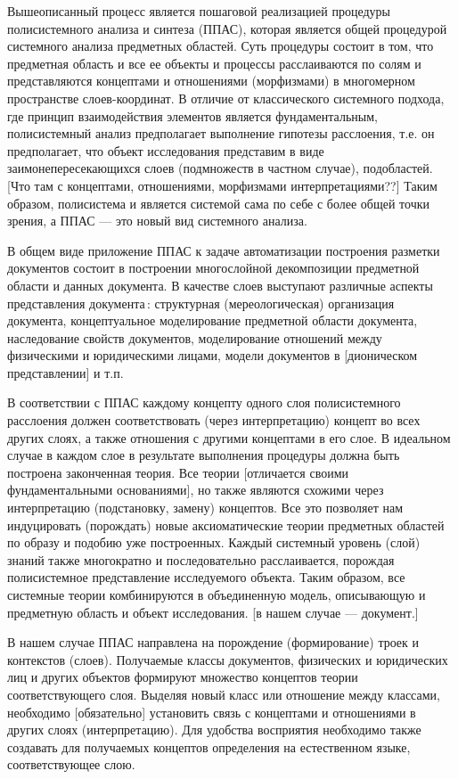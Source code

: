 \documentclass[utf8]{../IncArticle}
\newcommand{\e}[2][fcolor]{\textcolor{pcolor}{[}\textcolor{#1}{#2}\textcolor{pcolor}{]}}
\begin{document}
Вышеописанный процесс является пошаговой реализацией процедуры
полисистемного анализа и синтеза \cite{father} (ППАС), которая
является общей процедурой системного анализа предметных областей.
Суть процедуры состоит в том, что предметная область и все ее объекты
и процессы расслаиваются по солям и представляются концептами и
отношениями (морфизмами) в многомерном пространстве слоев-координат.
В отличие от классического системного подхода, где принцип
взаимодействия элементов является фундаментальным, полисистемный
анализ предполагает выполнение гипотезы расслоения, т.е. он
предполагает, что объект исследования представим в виде
заимонепересекающихся слоев (подмножеств в частном случае),
подобластей. \e{Что там с концептами, отношениями, морфизмами интерпретациями??}  Таким образом, полисистема и является системой сама по
себе с более общей точки зрения, а ППАС --- это новый вид системного
анализа.

В общем виде приложение ППАС к задаче автоматизации построения
разметки документов состоит в построении многослойной декомпозиции
предметной области и данных документа. В качестве слоев выступают
различные аспекты представления документа\,: структурная
(мереологическая) организация документа, концептуальное моделирование
предметной области документа, наследование свойств документов,
моделирование отношений между физическими и юридическими лицами,
модели документов в \e{дионическом представлении} и т.п.

В соответствии с ППАС \cite{father} каждому концепту одного слоя
полисистемного расслоения должен соответствовать (через интерпретацию)
концепт во всех других слоях, а также отношения с другими концептами в
его слое.  В идеальном случае в каждом слое в результате выполнения
процедуры должна быть построена законченная теория.  Все теории
\e{отличается своими фундаментальными основаниями}, но также являются
схожими через интерпретацию (подстановку, замену) концептов.  Все это
позволяет нам индуцировать (порождать) новые аксиоматические теории
предметных областей по образу и подобию уже построенных.  Каждый
системный уровень (слой) знаний также многократно и последовательно расслаивается,
порождая полисистемное представление исследуемого объекта.  Таким
образом, все системные теории комбинируются в объединенную модель,
описывающую и предметную область и объект исследования.  \e{в нашем
  случае --- документ.}

В нашем случае ППАС направлена на порождение (формирование) троек и
контекстов (слоев).  Получаемые классы документов, физических и
юридических лиц и других объектов формируют множество концептов
теории соответствующего слоя.  Выделяя новый класс или отношение между
классами, необходимо \e{обязательно} установить связь с концептами и отношениями в
других слоях (интерпретацию).  Для удобства восприятия необходимо
также создавать для получаемых концептов определения на естественном
языке, соответствующее слою.
\end{document}
